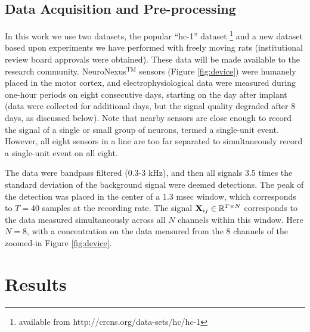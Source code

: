 \documentclass[journal]{IEEEtran}
\newcommand{\jovo}[1]{{\color{magenta}{\it #1}}}
\begin{document}
\subsection{Data Acquisition and Pre-processing} %
\label{sub:data_acquisition_and_pre_processing}


In this work we use two datasets, the popular ``hc-1'' dataset
\footnote{available from http://crcns.org/data-sets/hc/hc-1} and a new dataset based upon experiments we have performed with freely moving rats (institutional review board approvals were obtained). These data will be made available to the research community. NeuroNexus$^{\mbox{TM}}$ sensors (Figure \ref{fig:device}) were humanely placed in the motor cortex, and electrophysiological data were measured during one-hour periods on eight consecutive days, starting on the day after implant (data were collected for additional days, but the signal quality degraded after 8 days, as discussed below). Note that nearby sensors are close enough to record the signal of a single or small group of neurons, termed a single-unit event. However, all eight sensors in a line are too far separated to simultaneously record a single-unit event on all eight.


The data were bandpass filtered (0.3-3 kHz), and
then all signals 3.5 times the standard deviation of the background
signal were deemed detections. The peak of the detection was placed
in the center of a 1.3 msec window, which corresponds to $T=40$
samples at the recording rate. The signal
${\mathbf X}_{ij}\in\mathbb{R}^{T\times N}$ corresponds to the data
measured simultaneously across all $N$ channels within this window.
Here $N=8$, with a concentration on the data measured from the 8
channels of the zoomed-in Figure \ref{fig:device}.%


 \jovo{seems like one of the reviewers wants more details here.  i don't have them though. DEC has emailed colin, i believe, to get them.}


\section{Results\label{sec:results}}
\end{document}
